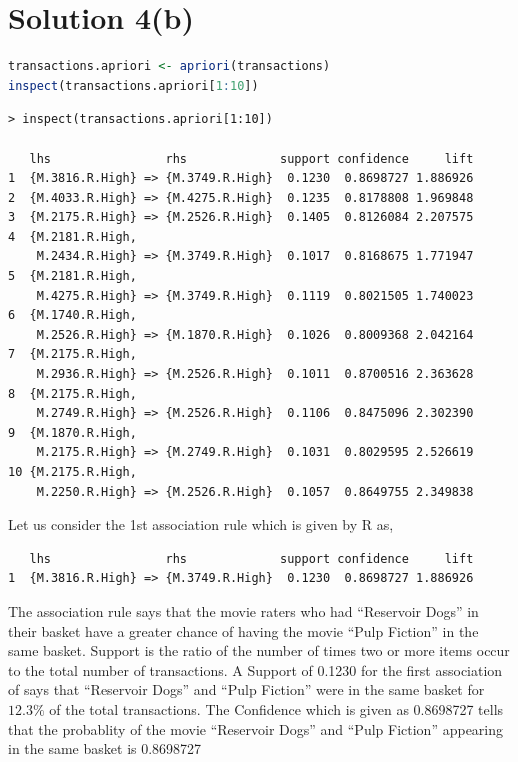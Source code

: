 \documentclass[a4paper,20pt]{article}
\begin{document}
\section*{Solution 4(b)}
\begin{lstlisting}[language=R]
transactions.apriori <- apriori(transactions)
inspect(transactions.apriori[1:10])
\end{lstlisting}
\begin{verbatim}
> inspect(transactions.apriori[1:10])

   lhs                rhs             support confidence     lift
1  {M.3816.R.High} => {M.3749.R.High}  0.1230  0.8698727 1.886926
2  {M.4033.R.High} => {M.4275.R.High}  0.1235  0.8178808 1.969848
3  {M.2175.R.High} => {M.2526.R.High}  0.1405  0.8126084 2.207575
4  {M.2181.R.High,                                               
    M.2434.R.High} => {M.3749.R.High}  0.1017  0.8168675 1.771947
5  {M.2181.R.High,                                               
    M.4275.R.High} => {M.3749.R.High}  0.1119  0.8021505 1.740023
6  {M.1740.R.High,                                               
    M.2526.R.High} => {M.1870.R.High}  0.1026  0.8009368 2.042164
7  {M.2175.R.High,                                               
    M.2936.R.High} => {M.2526.R.High}  0.1011  0.8700516 2.363628
8  {M.2175.R.High,                                               
    M.2749.R.High} => {M.2526.R.High}  0.1106  0.8475096 2.302390
9  {M.1870.R.High,                                               
    M.2175.R.High} => {M.2749.R.High}  0.1031  0.8029595 2.526619
10 {M.2175.R.High,                                               
    M.2250.R.High} => {M.2526.R.High}  0.1057  0.8649755 2.349838
\end{verbatim}
Let us consider the 1st association rule which is given by R as,
\begin{verbatim}
   lhs                rhs             support confidence     lift
1  {M.3816.R.High} => {M.3749.R.High}  0.1230  0.8698727 1.886926
\end{verbatim}
The association rule says that the movie raters who had ``Reservoir Dogs'' in their basket have a greater
chance of having the movie ``Pulp Fiction'' in the same basket. Support is the ratio of the number of times
two or more items occur to the total number of transactions. A Support of 0.1230 for the first association of says that ``Reservoir Dogs'' and ``Pulp Fiction''
were in the same basket for $12.3\%$ of the total transactions.
The Confidence which is given as  0.8698727
tells that the probablity of the movie ``Reservoir Dogs'' and ``Pulp Fiction'' appearing in the same basket
is 0.8698727
\newpage
\end{document}
